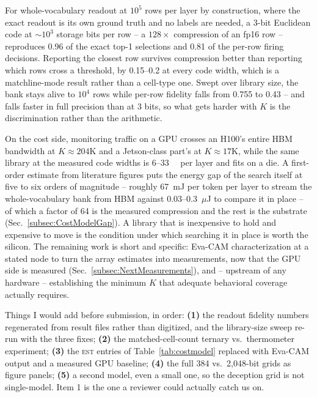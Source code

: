 For whole-vocabulary readout at $10^{5}$ rows per layer by construction,
where the exact readout is its own ground truth and no labels are needed,
a 3-bit Euclidean code at $\sim$$10^{3}$ storage bits per row -- a
$128\times$ compression of an fp16 row -- reproduces 0.96 of the exact
top-1 selections and 0.81 of the per-row firing decisions. Reporting the
closest row survives compression better than reporting which rows cross a
threshold, by 0.15--0.2 at every code width, which is a matchline-mode
result rather than a cell-type one. Swept over library size, the bank
stays alive to $10^{4}$ rows while per-row fidelity falls from 0.755 to
0.43 -- and falls faster in full precision than at 3 bits, so what gets
harder with $K$ is the discrimination rather than the arithmetic.

On the cost side, monitoring traffic on a GPU crosses an H100's entire
HBM bandwidth at $K\!\approx\!204$K and a Jetson-class part's at
$K\!\approx\!17$K, while the same library at the measured code widths is
6--\qty{33}{\mega\byte} per layer and fits on a die. A first-order
estimate from literature figures puts the energy gap of the search
itself at five to six orders of magnitude -- roughly 67~mJ per token
per layer to stream the whole-vocabulary bank from HBM against
0.03--0.3~$\mu$J to compare it in place -- of which a factor of 64 is
the measured compression and the rest is the substrate
(Sec.~\ref{subsec:CostModelGap}). A library that is inexpensive to
hold and expensive to move is the condition under which searching it
in place is worth the silicon. The remaining work is short and
specific: Eva-CAM characterization at a stated node to turn the array
estimates into measurements, now that the GPU side is measured
(Sec.~\ref{subsec:NextMeasurements}), and -- upstream of any hardware
-- establishing the minimum $K$ that adequate behavioral coverage
actually requires.

\begin{pnote}
Things I would add before submission, in order: {\bf (1)} the readout
fidelity numbers regenerated from result files rather than digitized, and
the library-size sweep re-run with the three fixes; {\bf (2)} the
matched-cell-count ternary vs.\ thermometer experiment;
{\bf (3)} the \textsc{est} entries of Table~\ref{tab:costmodel}
replaced with Eva-CAM output and a measured GPU baseline; {\bf (4)} the full
384 vs.\ 2{,}048-bit grids as figure panels; {\bf (5)} a second model,
even a small one, so the deception grid is not single-model. Item 1 is
the one a reviewer could actually catch us on.
\end{pnote}
